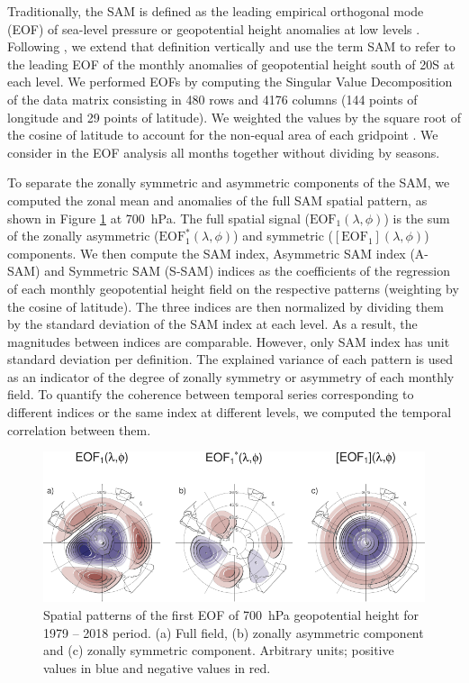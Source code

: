 \documentclass[smallextended]{svjour3}       %
\begin{document}
Traditionally, the SAM is defined as the leading empirical orthogonal mode (EOF) of sea-level pressure or geopotential height anomalies at low levels \citep{ho2012}.
Following \citet{baldwin2001}, we extend that definition vertically and use the term SAM to refer to the leading EOF of the monthly anomalies of geopotential height south of 20\degree S at each level.
We performed EOFs by computing the Singular Value Decomposition of the data matrix consisting in 480 rows and 4176 columns (144 points of longitude and 29 points of latitude).
We weighted the values by the square root of the cosine of latitude to account for the non-equal area of each gridpoint \citep{chung1999}.
We consider in the EOF analysis all months together without dividing by seasons.

To separate the zonally symmetric and asymmetric components of the SAM, we computed the zonal mean and anomalies of the full SAM spatial pattern, as shown in Figure \ref{fig:method} at 700~hPa.
The full spatial signal (\(\mathrm{EOF_1}(\lambda, \phi)\)) is the sum of the zonally asymmetric (\(\mathrm{EOF_1^*}(\lambda, \phi)\)) and symmetric (\([\mathrm{EOF_1}](\lambda, \phi)\)) components.
We then compute the SAM index, Asymmetric SAM index (A\nobreakdash-SAM) and Symmetric SAM (S\nobreakdash-SAM) indices as the coefficients of the regression of each monthly geopotential height field on the respective patterns (weighting by the cosine of latitude).
The three indices are then normalized by dividing them by the standard deviation of the SAM index at each level.
As a result, the magnitudes between indices are comparable.
However, only SAM index has unit standard deviation per definition.
The explained variance of each pattern is used as an indicator of the degree of zonally symmetry or asymmetry of each monthly field.
To quantify the coherence between temporal series corresponding to different indices or the same index at different levels, we computed the temporal correlation between them.



\begin{figure}
\includegraphics{method-1} \caption{Spatial patterns of the first EOF of 700~hPa geopotential height for 1979 -- 2018 period. (a) Full field, (b) zonally asymmetric component and (c) zonally symmetric component. Arbitrary units; positive values in blue and negative values in red.}\label{fig:method}
\end{figure}
\end{document}
